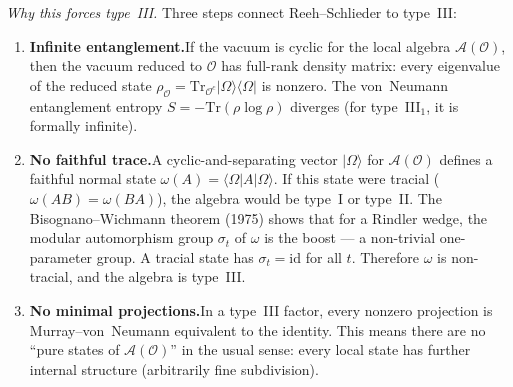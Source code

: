 \documentclass[11pt,a4paper]{article}
\theoremstyle{definition}
\begin{document}
\smallskip\noindent\textit{Why this forces type~III.}\quad
Three steps connect Reeh--Schlieder to type~III:
\begin{enumerate}[label=(\roman*),nosep]
  \item \textbf{Infinite entanglement.}\quad If the vacuum is cyclic for
  the local algebra $\mathcal{A}(\mathcal{O})$, then the vacuum reduced
  to $\mathcal{O}$ has full-rank density matrix: every eigenvalue of the
  reduced state $\rho_{\mathcal{O}} = \mathrm{Tr}_{\mathcal{O}^c}
  |\Omega\rangle\langle\Omega|$ is nonzero.  The von~Neumann
  entanglement entropy $S = -\mathrm{Tr}(\rho \log \rho)$ diverges
  (for type~III$_1$, it is formally infinite).
  \item \textbf{No faithful trace.}\quad A cyclic-and-separating
  vector $|\Omega\rangle$ for $\mathcal{A}(\mathcal{O})$ defines a
  faithful normal state $\omega(A) = \langle\Omega|A|\Omega\rangle$.
  If this state were tracial ($\omega(AB) = \omega(BA)$), the algebra
  would be type~I or type~II.  The Bisognano--Wichmann theorem (1975)
  shows that for a Rindler wedge, the modular automorphism group
  $\sigma_t$ of $\omega$ is the boost --- a non-trivial one-parameter
  group.  A tracial state has $\sigma_t = \mathrm{id}$ for all $t$.
  Therefore $\omega$ is non-tracial, and the algebra is type~III.
  \item \textbf{No minimal projections.}\quad In a type~III factor,
  every nonzero projection is Murray--von~Neumann equivalent to the
  identity.  This means there are no ``pure states of
  $\mathcal{A}(\mathcal{O})$'' in the usual sense: every local state
  has further internal structure (arbitrarily fine subdivision).
\end{enumerate}
\end{document}

